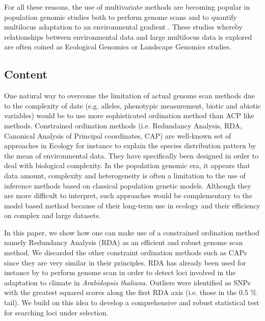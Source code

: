 \documentclass[a4paper,times,10pt,authoryear]{article}%
\begin{document}

For all these reasons, the use of multivariate methods are becoming popular in population genomic studies both to perform genome scans and to quantify multilocus adaptation to an environmental gradient \citep{Lasky2012,DeKort2014,Steane2014a,Hecht2015}. These studies whereby relationships between environmental data and large multilocus data is explored are often coined as Ecological Genomics or Landscape Genomics studies.
	

\subsection{Content}

One natural way to overcome the limitation of actual genome scan methods due to the complexity of date (e.g. alleles, phenotypic measurement, biotic and abiotic variables) would be to use more sophisticated ordination method than ACP like methods. Constrained ordination methods (i.e. Redundancy Analysis, RDA, Canonical Analysis of Principal coordinates, CAP) are well-known set of approaches in Ecology for instance to explain the species distribution pattern by the mean of environmental data. They have specifically been designed in order to deal with biological complexity. In the population genomic era, it appears that data amount, complexity and heterogeneity is often a limitation to the use of inference methods based on classical population genetic models. Although they are more difficult to interpret, such approaches would be complementary to the model based method because of their long-term use in ecology and their efficiency on complex and large datasets. 

In this paper, we show how one can make use of a constrained ordination method namely Redundancy Analysis (RDA) as an efficient and robust genome scan method. We discarded the other constraint ordination methods such as CAPs since they are very similar in their principles. RDA has already been used for instance by \citet{Lasky2012} to perform genome scan in order to detect loci involved in the adaptation to climate in \textit{Arabidopsis thaliana}. Outliers were identified as SNPs with the greatest squared scores along the first RDA axis (i.e. those in the 0.5 \% tail). We build on this idea to develop a comprehensive and robust statistical test for searching loci under selection. 
\end{document}
